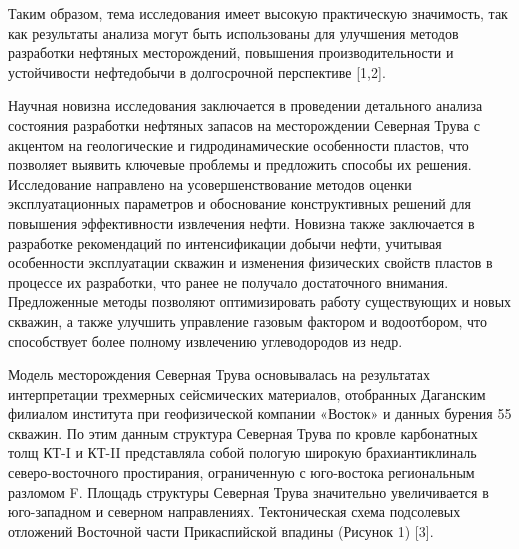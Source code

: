 Таким образом, тема исследования имеет высокую практическую значимость,
так как результаты анализа могут быть использованы для улучшения методов
разработки нефтяных месторождений, повышения производительности и
устойчивости нефтедобычи в долгосрочной перспективе {[}1,2{]}.

Научная новизна исследования заключается в проведении детального анализа
состояния разработки нефтяных запасов на месторождении Северная Трува с
акцентом на геологические и гидродинамические особенности пластов, что
позволяет выявить ключевые проблемы и предложить способы их решения.
Исследование направлено на усовершенствование методов оценки
эксплуатационных параметров и обоснование конструктивных решений для
повышения эффективности извлечения нефти. Новизна также заключается в
разработке рекомендаций по интенсификации добычи нефти, учитывая
особенности эксплуатации скважин и изменения физических свойств пластов
в процессе их разработки, что ранее не получало достаточного внимания.
Предложенные методы позволяют оптимизировать работу существующих и новых
скважин, а также улучшить управление газовым фактором и водоотбором, что
способствует более полному извлечению углеводородов из недр.

Модель месторождения Северная Трува основывалась на результатах
интерпретации трехмерных сейсмических материалов, отобранных Даганским
филиалом института при геофизической компании «Восток» и данных бурения
55 скважин. По этим данным структура Северная Трува по кровле
карбонатных толщ КТ-I и КТ-II представляла собой пологую широкую
брахиантиклиналь северо-восточного простирания, ограниченную с
юго-востока региональным разломом F. Площадь структуры Северная Трува
значительно увеличивается в юго-западном и северном направлениях.
Тектоническая схема подсолевых отложений Восточной части Прикаспийской
впадины (Рисунок 1) {[}3{]}.

